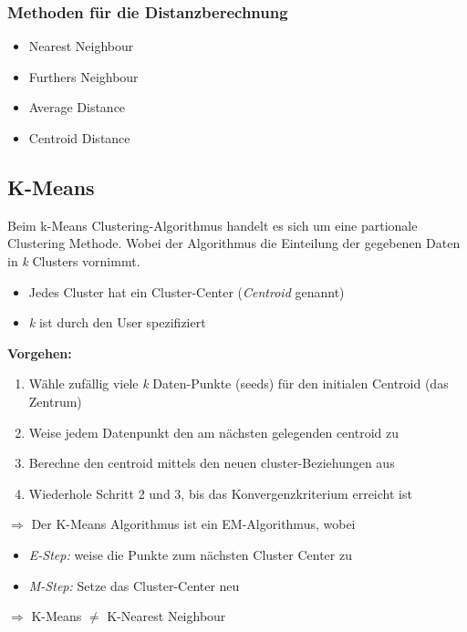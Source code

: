 \documentclass{article}
\theoremstyle{merke}
\theoremstyle{definition}
\begin{document}
            \subsubsection{Methoden für die Distanzberechnung}
            \begin{itemize}
                \item Nearest Neighbour 
                \item Furthers Neighbour
                \item Average Distance
                \item Centroid Distance
            \end{itemize}	

        \subsection{K-Means}
        Beim k-Means Clustering-Algorithmus handelt es sich um eine partionale Clustering Methode. Wobei der Algorithmus die Einteilung der gegebenen Daten in \textit{k} Clusters vornimmt.
        \begin{itemize}
            \item Jedes Cluster hat ein Cluster-Center (\textit{Centroid} genannt)
            \item \textit{k} ist durch den User spezifiziert
        \end{itemize}
        \textbf{Vorgehen:}\\
        \begin{enumerate}
            \item Wähle zufällig viele \textit{k} Daten-Punkte (seeds) für den initialen Centroid (das Zentrum)
            \item Weise jedem Datenpunkt den am nächsten gelegenden centroid zu
            \item Berechne den centroid mittels den neuen cluster-Beziehungen aus
            \item Wiederhole Schritt 2 und 3, bis das Konvergenzkriterium erreicht ist
        \end{enumerate}
        $\Rightarrow$ Der K-Means Algorithmus ist ein EM-Algorithmus, wobei 
        \begin{itemize}
            \item \textit{E-Step:} weise die Punkte zum nächsten Cluster Center zu
            \item \textit{M-Step:} Setze das Cluster-Center neu
        \end{itemize}
        $\Rightarrow$ K-Means $\neq$ K-Nearest Neighbour
\end{document}
